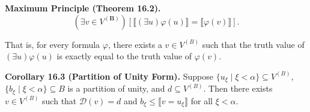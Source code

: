 \textbf{Maximum Principle (Theorem 16.2).}
$$(\exists v \in V^{(\mathbf{B})}) [\llbracket (\exists u) \varphi(u) \rrbracket = \llbracket \varphi(v) \rrbracket].$$

That is, for every formula $\varphi$, there exists a $v \in V^{(B)}$ such that the truth value of $(\exists u)\varphi(u)$ is exactly equal to the truth value of $\varphi(v)$.

\textbf{Corollary 16.3 (Partition of Unity Form).}
Suppose $\{u_\xi \mid \xi < \alpha\} \subseteq V^{(B)}$, $\{b_\xi \mid \xi < \alpha\} \subseteq B$ is a partition of unity, and $d \subseteq V^{(B)}$. Then there exists $v \in V^{(B)}$ such that $\mathcal{D}(v) = d$ and $b_\xi \leq \llbracket v = u_\xi \rrbracket$ for all $\xi < \alpha$.
